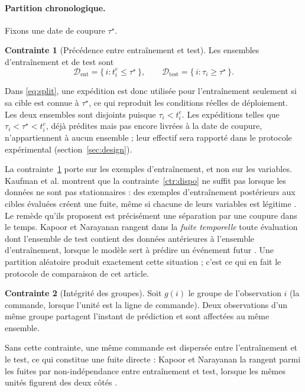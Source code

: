 \documentclass[11pt,a4paper]{article}
\theoremstyle{definition}
\newtheorem{contrainte}{Contrainte}
\begin{document}
\paragraph{Partition chronologique.} Fixons une date de coupure $\tau^\star$.
\begin{contrainte}[Précédence entre entraînement et test]
\label{ctr:prec}
Les ensembles d'entraînement et de test sont
\begin{equation}
  \mathcal{D}_{\mathrm{ent}} = \{\, i : t_i^{e} \le \tau^\star \,\}, \qquad
  \mathcal{D}_{\mathrm{test}} = \{\, i : \tau_i \ge \tau^\star \,\}.
  \label{eq:split}
\end{equation}
\end{contrainte}
Dans \eqref{eq:split}, une expédition est donc utilisée pour l'entraînement seulement si sa cible est connue à $\tau^\star$, ce qui reproduit les conditions réelles de déploiement. Les deux ensembles sont disjoints puisque $\tau_i < t_i^{e}$. Les expéditions telles que $\tau_i < \tau^\star < t_i^{e}$, déjà prédites mais pas encore livrées à la date de coupure, n'appartiennent à aucun ensemble ; leur effectif sera rapporté dans le protocole expérimental (section~\ref{sec:design}).

La contrainte~\ref{ctr:prec} porte sur les exemples d'entraînement, et non sur les variables. Kaufman et al. montrent que la contrainte~\ref{ctr:dispo} ne suffit pas lorsque les données ne sont pas stationnaires : des exemples d'entraînement postérieurs aux cibles évaluées créent une fuite, même si chacune de leurs variables est légitime \cite{kaufman2012leakage}. Le remède qu'ils proposent est précisément une séparation par une coupure dans le temps. Kapoor et Narayanan rangent dans la \emph{fuite temporelle} toute évaluation dont l'ensemble de test contient des données antérieures à l'ensemble d'entraînement, lorsque le modèle sert à prédire un événement futur \cite{kapoor2023leakage}. Une partition aléatoire produit exactement cette situation ; c'est ce qui en fait le protocole de comparaison de cet article.

\begin{contrainte}[Intégrité des groupes]
\label{ctr:groupes}
Soit $g(i)$ le groupe de l'observation $i$ (la commande, lorsque l'unité est la ligne de commande). Deux observations d'un même groupe partagent l'instant de prédiction et sont affectées au même ensemble.
\end{contrainte}
Sans cette contrainte, une même commande est dispersée entre l'entraînement et le test, ce qui constitue une fuite directe : Kapoor et Narayanan la rangent parmi les fuites par non-indépendance entre entraînement et test, lorsque les mêmes unités figurent des deux côtés \cite{kapoor2023leakage}.
\end{document}
